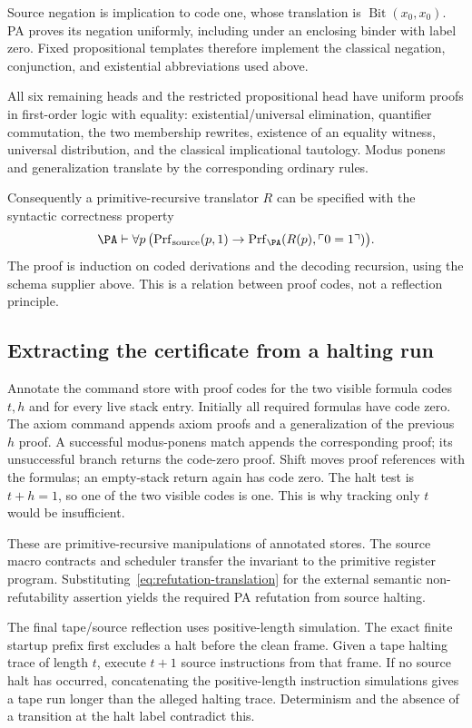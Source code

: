 Source negation is implication to code one, whose translation is \(\operatorname{Bit}(x_0,x_0)\). PA proves its negation uniformly, including under an enclosing binder with label zero. Fixed propositional templates therefore implement the classical negation, conjunction, and existential abbreviations used above.

All six remaining heads and the restricted propositional head have uniform proofs in first-order logic with equality: existential/universal elimination, quantifier commutation, the two membership rewrites, existence of an equality witness, universal distribution, and the classical implicational tautology. Modus ponens and generalization translate by the corresponding ordinary rules.

Consequently a primitive-recursive translator \(R\) can be specified with the syntactic correctness property
\begin{equation}\label{eq:refutation-translation}
 \PA\vdash\forall p\,
 \bigl(\operatorname{Prf}_{\mathrm{source}}(p,1)
 \to\operatorname{Prf}_{\PA}(R(p),\ulcorner0=1\urcorner)\bigr).
\end{equation}
The proof is induction on coded derivations and the decoding recursion, using the schema supplier above. This is a relation between proof codes, not a reflection principle.

\subsection{Extracting the certificate from a halting run}
Annotate the command store with proof codes for the two visible formula codes \(t,h\) and for every live stack entry. Initially all required formulas have code zero. The axiom command appends axiom proofs and a generalization of the previous \(h\) proof. A successful modus-ponens match appends the corresponding proof; its unsuccessful branch returns the code-zero proof. Shift moves proof references with the formulas; an empty-stack return again has code zero. The halt test is \(t+h=1\), so one of the two visible codes is one. This is why tracking only \(t\) would be insufficient.

These are primitive-recursive manipulations of annotated stores. The source macro contracts and scheduler transfer the invariant to the primitive register program. Substituting~\eqref{eq:refutation-translation} for the external semantic non-refutability assertion yields the required PA refutation from source halting.

The final tape/source reflection uses positive-length simulation. The exact finite startup prefix first excludes a halt before the clean frame. Given a tape halting trace of length \(t\), execute \(t+1\) source instructions from that frame. If no source halt has occurred, concatenating the positive-length instruction simulations gives a tape run longer than the alleged halting trace. Determinism and the absence of a transition at the halt label contradict this.

